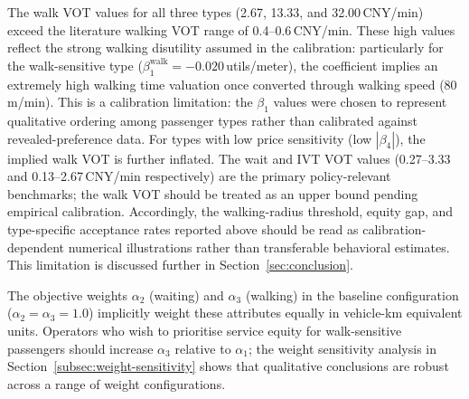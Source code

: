 The walk VOT values for all three types (2.67, 13.33, and 32.00\,CNY/min)
exceed the literature walking VOT range of 0.4--0.6\,CNY/min. These high values
reflect the strong walking disutility assumed in the calibration: particularly
for the walk-sensitive type ($\beta_1^{\text{walk}} = -0.020$\,utils/meter),
the coefficient implies an extremely high walking time valuation once converted
through walking speed (80\,m/min). This is a calibration limitation: the
$\beta_1$ values were chosen to represent qualitative ordering among passenger
types rather than calibrated against revealed-preference data.
For types with low price sensitivity (low $|\beta_4|$), the implied walk VOT
is further inflated. The wait and IVT VOT values (0.27--3.33 and 0.13--2.67\,CNY/min
respectively) are the primary policy-relevant benchmarks; the walk VOT should
be treated as an upper bound pending empirical calibration. Accordingly, the
walking-radius threshold, equity gap, and type-specific acceptance rates reported
above should be read as calibration-dependent numerical illustrations rather than
transferable behavioral estimates. This limitation is discussed further in
Section~\ref{sec:conclusion}.

The objective weights $\alpha_2$ (waiting) and $\alpha_3$ (walking) in the
baseline configuration ($\alpha_2 = \alpha_3 = 1.0$) implicitly weight these
attributes equally in vehicle-km equivalent units. Operators who wish to
prioritise service equity for walk-sensitive passengers should increase
$\alpha_3$ relative to $\alpha_1$; the weight sensitivity analysis in
Section~\ref{subsec:weight-sensitivity} shows that qualitative conclusions
are robust across a range of weight configurations.
